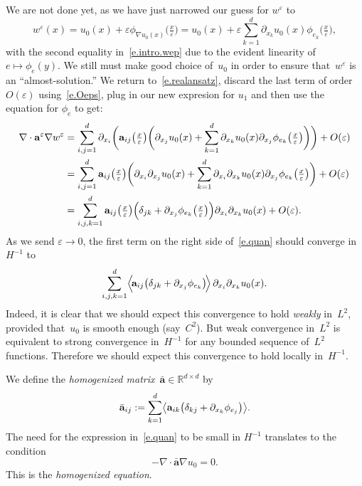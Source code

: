 \documentclass[11pt]{article} %
\numberwithin{equation}{section}
\theoremstyle{definition}
\let\originalleft\left
\let\originalright\right
\renewcommand{\left}{\mathopen{}\mathclose\bgroup\originalleft}
\renewcommand{\right}{\aftergroup\egroup\originalright}
\newcommand*{\R}{\ensuremath{\mathbb{R}}}
\newcommand{\eps}{\varepsilon}
\newcommand{\ep}{\eps}
\renewcommand{\a}{\mathbf{a}}
\newcommand{\ahom}{\bar{\a}}
\begin{document}
\smallskip

We are not done yet, as we have just narrowed our guess for $w^\ep$ to 
\begin{equation}
\label{e.intro.wep}
w^\ep (x) = u_0(x) + \ep \phi_{\nabla u_0(x)}\bigl(\tfrac x\ep \bigr) 
= 
u_0(x) + \ep \sum_{k=1}^d \partial_{x_k}u_0(x) \phi_{e_k}\bigl(\tfrac x\ep \bigr),
\end{equation}
with the second equality in~\eqref{e.intro.wep} due to the evident linearity of $e\mapsto \phi_e(y)$. We still must make good choice of~$u_0$ in order to ensure that~$w^\ep$ is an ``almost-solution.'' We return to~\eqref{e.realansatz}, discard the last term of order~$O(\ep)$ using~\eqref{e.Oeps}, plug in our new expresion for $u_1$ and then use the equation for $\phi_e$ to get:
\begin{align}
\label{e.heurthreelines}
\nabla \cdot\a^\ep \nabla w^\ep 
&
=
\sum_{i,j=1}^d
\partial_{x_i} 
\biggl(
\a_{ij}\bigl(\tfrac x\ep \bigr) 
\biggl(
\partial_{x_j} u_0(x) 
+
\sum_{k=1}^d \partial_{x_k}u_0(x) \partial_{x_j} \phi_{e_k} \bigl(\tfrac x\ep \bigr)
\biggr)
\biggr)
+O(\ep)
\notag \\ &
=
\sum_{i,j=1}^d
\a_{ij}\bigl(\tfrac x\ep \bigr)
\biggl( \partial_{x_i}\partial_{x_j} u_0(x) + 
\sum_{k=1}^d \partial_{x_i}\partial_{x_k}u_0(x) \partial_{x_j} \phi_{e_k} \bigl(\tfrac x\ep \bigr) \biggr)
+O(\ep)
\notag \\ &
=
\sum_{i,j,k=1}^d
\a_{ij}\bigl(\tfrac x\ep \bigr) 
\Bigl( \delta_{jk} 
+ 
\partial_{x_j} \phi_{e_k} \bigl(\tfrac x\ep \bigr) \Bigr)
\partial_{x_i}\partial_{x_k} u_0(x) 
+ O(\ep).
\end{align}
As we send $\ep \to 0$, the first term on the right side of~\eqref{e.quan} should converge in~$H^{-1}$ to 
\begin{equation}
\label{e.quan}
\sum_{i,j,k=1}^d
\Bigl\langle \!
\a_{ij}\left( \delta_{jk} 
+ 
\partial_{x_j} \phi_{e_k} \right)
\! \Bigr\rangle \,
\partial_{x_i}\partial_{x_k} u_0(x).
\end{equation}
Indeed, it is clear that we should expect this convergence to hold \emph{weakly} in~$L^2$, provided that~$u_0$ is smooth enough (say~$C^2$). But weak convergence in~$L^2$ is equivalent to strong convergence in~$H^{-1}$ for any bounded sequence of~$L^2$ functions. Therefore we should expect this convergence to hold locally in~$H^{-1}$. 

\smallskip

We define the \emph{homogenized matrix}~$\ahom\in \R^{d\times d}$ by
\begin{equation}
\ahom_{ij} 
:= 
\sum_{k=1}^d 
\left\langle \a_{ik}\left( \delta_{kj} 
+ 
\partial_{x_k} \phi_{e_j} \right)
\right\rangle.
\end{equation}
The need for the expression in~\eqref{e.quan} to be small in $H^{-1}$ translates to the condition
\begin{equation}
\label{e.pde.homoge}
-\nabla \cdot \ahom \nabla u_0 = 0. 
\end{equation}
This is the \emph{homogenized equation}. 
\end{document}
